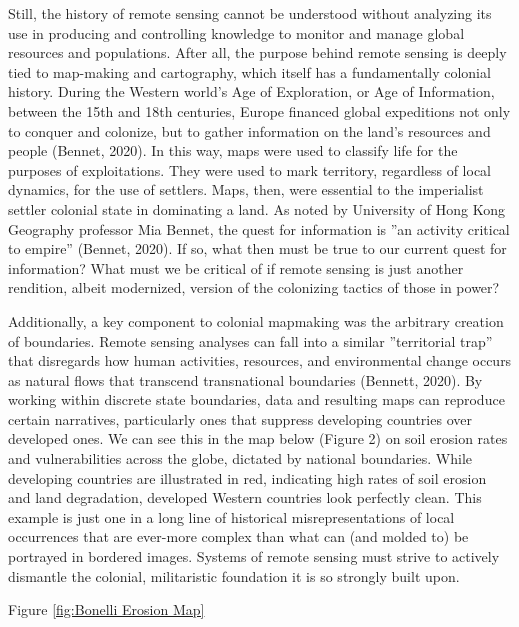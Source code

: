 \documentclass{book}\usepackage{knitr}
\begin{document}
Still, the history of remote sensing cannot be understood without analyzing its use in producing and controlling knowledge to monitor and manage global resources and populations. After all, the purpose behind remote sensing is deeply tied to map-making and cartography, which itself has a fundamentally colonial history. During the Western world’s Age of Exploration, or Age of Information, between the 15th and 18th centuries, Europe financed global expeditions not only to conquer and colonize, but to gather information on the land’s resources and people (Bennet, 2020). In this way, maps were used to classify life for the purposes of exploitations. They were used to mark territory, regardless of local dynamics, for the use of settlers. Maps, then, were essential to the imperialist settler colonial state in dominating a land. As noted by University of Hong Kong Geography professor Mia Bennet, the quest for information is ''an activity critical to empire'' (Bennet, 2020). If so, what then must be true to our current quest for information? What must we be critical of if remote sensing is just another rendition, albeit modernized, version of the colonizing tactics of those in power?

Additionally, a key component to colonial mapmaking was the arbitrary creation of boundaries. Remote sensing analyses can fall into a similar ''territorial trap'' that disregards how human activities, resources, and environmental change occurs as natural flows that transcend transnational boundaries (Bennett, 2020). By working within discrete state boundaries, data and resulting maps can reproduce certain narratives, particularly ones that suppress developing countries over developed ones. We can see this in the map below (Figure 2) on soil erosion rates and vulnerabilities across the globe, dictated by national boundaries. While developing countries are illustrated in red, indicating high rates of soil erosion and land degradation, developed Western countries look perfectly clean. This example is just one in a long line of historical misrepresentations of local occurrences that are ever-more complex than what can (and molded to) be portrayed in bordered images. Systems of remote sensing must strive to actively dismantle the colonial, militaristic foundation it is so strongly built upon.

Figure \ref{fig:Bonelli Erosion Map}
\end{document}
